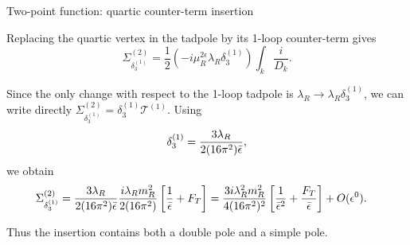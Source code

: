 \documentclass[aspectratio=169,10pt]{beamer}
\begin{document}

% 
\begin{frame}{Two-point function: quartic counter-term insertion}

Replacing the quartic vertex in the tadpole by its 1-loop
counter-term gives
\begin{equation}
\Sigma_{\delta_3^{(1)}}^{(2)}
=
\frac12
\left(
-i\mu_R^{2\epsilon}\lambda_R\delta_3^{(1)}
\right)
\int_k\frac{i}{D_k}.
\end{equation}

Since the only change with respect to the 1-loop tadpole is $\lambda_R
\longrightarrow
\lambda_R\delta_3^{(1)}$, we can write directly $\Sigma_{\delta_3^{(1)}}^{(2)}
=
\delta_3^{(1)}
\mathcal T^{(1)}$. Using
\begin{equation}
\delta_3^{(1)}
=
\frac{3\lambda_R}{2(16\pi^2)\bar\epsilon},
\end{equation}
we obtain
\begin{align}
\Sigma_{\delta_3^{(1)}}^{(2)}
&=
\frac{3\lambda_R}
{2(16\pi^2)\bar\epsilon}
\frac{i\lambda_Rm_R^2}{2(16\pi^2)}
\left[
\frac1{\bar\epsilon}
+
F_T
\right]=
\frac{3i\lambda_R^2m_R^2}
{4(16\pi^2)^2}
\left[
\frac1{\bar\epsilon^2}
+
\frac{F_T}{\bar\epsilon}
\right]
+
O(\epsilon^0).
\end{align}

Thus the insertion contains both a double pole and a simple pole.


\end{frame}
\end{document}
